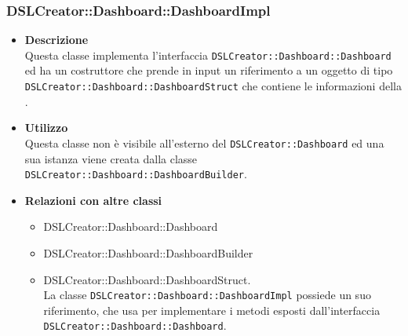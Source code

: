                 \subsubsection{DSLCreator::Dashboard::DashboardImpl}
                    \begin{itemize}
                        \item \textbf{Descrizione} \hfill \\
                            Questa classe implementa l'interfaccia \texttt{DSLCreator::Dashboard::Dashboard} ed ha un costruttore che prende in input un riferimento a un oggetto di tipo \\ \texttt{DSLCreator::Dashboard::DashboardStruct} che contiene le informazioni della .
                        \item \textbf{Utilizzo} \hfill \\
                            Questa classe non è visibile all'esterno del  \texttt{DSLCreator::Dashboard} ed una sua istanza viene creata dalla classe \texttt{DSLCreator::Dashboard::DashboardBuilder}.
                        \item \textbf{Relazioni con altre classi}
                            \begin{itemize}
                              \item DSLCreator::Dashboard::Dashboard
                              \item DSLCreator::Dashboard::DashboardBuilder
                              \item DSLCreator::Dashboard::DashboardStruct. \\ La classe \texttt{DSLCreator::Dashboard::DashboardImpl} possiede un suo riferimento, che usa per implementare i metodi esposti dall'interfaccia \texttt{DSLCreator::\-Dashboard::Dashboard}.
                            \end{itemize}
                    \end{itemize}

